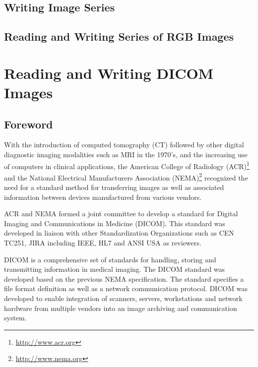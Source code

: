 \subsection{Writing Image Series}
\label{sec:WritingImageSeries}
%

\subsection{Reading and Writing Series of RGB Images}
\label{sec:ReadingWritingRGBImageSeries}
%


\section{Reading and Writing DICOM Images}
\label{sec:ReadingDicomImageSeries2}


\subsection{Foreword}
With the introduction of computed tomography (CT) followed by other digital
diagnostic imaging modalities such as MRI in the 1970's, and the increasing use
of computers in clinical applications, the American College of Radiology
(ACR)\footnote{\url{http://www.acr.org}} and the National Electrical
Manufacturers Association (NEMA)\footnote{\url{http://www.nema.org}} recognized
the need for a standard method for transferring images as well as associated
information between devices manufactured from various vendors.

ACR and NEMA formed a joint committee to develop a standard for Digital Imaging
and Communications in Medicine (DICOM).  This standard was developed in liaison
with other Standardization Organizations such as CEN TC251, JIRA including
IEEE, HL7 and ANSI USA as reviewers.

DICOM is a comprehensive set of standards for handling, storing and
transmitting information in medical imaging. The DICOM standard was developed
based on the previous NEMA specification.  The standard specifies a file format
definition as well as a network communication protocol. DICOM was developed to
enable integration of scanners, servers, workstations and network hardware from
multiple vendors into an image archiving and communication system.


